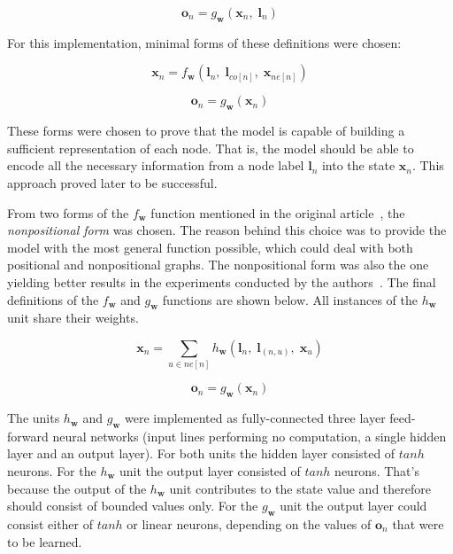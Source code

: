 \begin{equation}
\bm{o}_n = g_{\bm{w}}(\bm{x}_n, \; \bm{l}_n)
\label{eq:gnn_g}
\end{equation}

\noindent For this implementation, minimal forms of these definitions were chosen:

\begin{equation}
\bm{x}_n = f_{\bm{w}}(\bm{l}_n, \; \bm{l}_{co[n]}, \; \bm{x}_{ne[n]})
\label{eq:gnn_fmin}
\end{equation}

\begin{equation}
\bm{o}_n = g_{\bm{w}}(\bm{x}_n)
\label{eq:gnn_gmin}
\end{equation}

These forms were chosen to prove that the model is capable of building a sufficient representation of each node. That is, the model should be able to encode all the necessary information from a node label $\bm{l}_n$ into the state $\bm{x}_n$. This approach proved later to be successful.

From two forms of the $f_{\bm{w}}$ function mentioned in the original article~\cite{scarselli2009graph}, the \emph{nonpositional form} was chosen. The reason behind this choice was to provide the model with the most general function possible, which could deal with both positional and nonpositional graphs. The nonpositional form was also the one yielding better results in the experiments conducted by the authors~\cite{scarselli2009graph}. The final definitions of the  $f_{\bm{w}}$ and $g_{\bm{w}}$ functions are shown below. All instances of the $h_{\bm{w}}$ unit share their weights.

\begin{equation}
\bm{x}_n = \sum_{u \in ne[n]}h_{\bm{w}}(\bm{l}_n, \; \bm{l}_{(n,u)}, \; \bm{x}_{u})
\label{eq:gnn_ffinal}
\end{equation}

\begin{equation}
\bm{o}_n = g_{\bm{w}}(\bm{x}_n)
\label{eq:gnn_gfinal}
\end{equation}

The units $h_{\bm{w}}$ and $g_{\bm{w}}$ were implemented as fully-connected three layer feed-forward neural networks (input lines performing no computation, a single hidden layer and an output layer). For both units the hidden layer consisted of $tanh$ neurons. For the $h_{\bm{w}}$ unit the output layer consisted of $tanh$ neurons. That's because the output of the $h_{\bm{w}}$ unit contributes to the state value and therefore should consist of bounded values only. For the $g_{\bm{w}}$ unit the output layer could consist either of $tanh$ or linear neurons, depending on the values of $\bm{o}_n$ that were to be learned.

